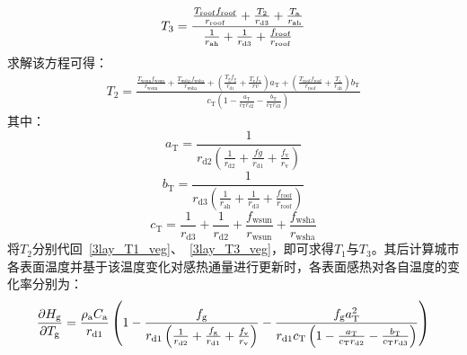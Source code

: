 %
\begin{equation}
  \label{3lay_T3_veg}
  T_{3} = \frac{\frac{T_{\mathrm{roof}} f_{\mathrm{roof}}}{r_{\mathrm{roof}}} + \frac{T_{2}}{r_{\mathrm{d3}}} + \frac{T_{\rm a}}{r_{\mathrm{ah}}}}{\frac{1}{r_{\mathrm{ah}}} + \frac{1}{r_{\mathrm{d3}}} + \frac{f_{\mathrm{roof}}}{r_{\mathrm{roof}}}}
\end{equation}
求解该方程可得：
\begin{equation}
  \begin{split}
    T_{2} = \frac{\frac{T_{\mathrm{wsun}} f_{\mathrm{wsun}}}{r_{\mathrm{wsun}}} + \frac{T_{\mathrm{wsha}} f_{\mathrm{wsha}}}{r_{\mathrm{wsha}}} + \left(\frac{T_{\mathrm{g}} f_{\mathrm{g}}}{r_{\mathrm{d1}}} + \frac{T_{\mathrm{v}} f_{\mathrm{v}}}{rv} \right)a_{\mathrm{T}} + \left(\frac{T_{\mathrm{roof}} f_{\mathrm{roof}}}{r_{\mathrm{roof}}} + \frac{T_{\mathrm{a}}}{r_{\mathrm{ah}}} \right)b_{\mathrm{T}}}{c_{\mathrm{T}} \left(1-\frac{a_{\mathrm{T}}}{c_{\mathrm{T}} r_{\mathrm{d2}}}-\frac{b_{\mathrm{T}}}{c_{\mathrm{T}} r_{\mathrm{d3}}}\right)}
  \end{split}
\end{equation}
其中：
\begin{equation}
  a_{\mathrm{T}} = \frac{1}{r_{\mathrm{d2}} \left(\frac{1}{r_{\mathrm{d2}}} + \frac{fg}{r_{\mathrm{d1}}} + \frac{f_{\mathrm{v}}}{r_{\mathrm{v}}} \right)}
\end{equation}
%
\begin{equation}
  b_{\mathrm{T}} = \frac{1}{r_{\mathrm{d3}} \left(\frac{1}{r_{\mathrm{ah}}} + \frac{1}{r_{\mathrm{d3}}} + \frac{f_{\mathrm{roof}}}{r_{\mathrm{roof}}} \right)}
\end{equation}
%
\begin{equation}
  c_{\mathrm{T}} = \frac{1}{r_{\mathrm{d3}}} + \frac{1}{r_{\mathrm{d2}}} + \frac{f_{\mathrm{wsun}}}{r_{\mathrm{wsun}}} + \frac{f_{\mathrm{wsha}}}{r_{\mathrm{wsha}}}
\end{equation}
将$T_{2}$分别代回~\eqref{3lay_T1_veg}、~\eqref{3lay_T3_veg}，即可求得$T_{1}$与$T_{3}$。其后计算城市各表面温度并基于该温度变化对感热通量进行更新时，各表面感热对各自温度的变化率分别为：
\begin{equation}
  \frac{\partial H_{\mathrm{g}}}{\partial T_{\mathrm{g}}} = \frac{\rho _{\rm a} C_{\mathrm a}}{r_{\mathrm{d1}}} \left(1-\frac{f_{\rm g}}{r_{\mathrm{d1}} \left(\frac{1}{r_{\mathrm{d2}}}+\frac{f_{\rm g}}{r_{\mathrm{d1}}}+\frac{f_{\rm v}}{r_{\rm v}}\right)} - \frac{f_{\rm g} a_{\mathrm{T}}^2}{r_{\mathrm{d1}} c_{\mathrm{T}} \left(1-\frac{a_{\mathrm{T}}}{c_{\mathrm{T}} r_{\mathrm{d2}}}-\frac{b_{\mathrm{T}}}{c_{\mathrm{T}} r_{\mathrm{d3}}}\right)}\right)
\end{equation}
